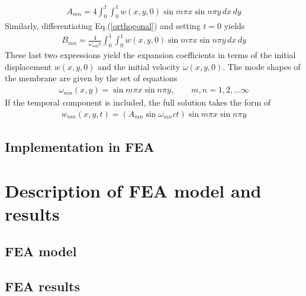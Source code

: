\documentclass[12pt]{article}
\begin{document}
\begin{align}
	A_{mn}=4\int_0^1\int_0^1 w(x,y,0)\sin m\pi x\sin n\pi y \,dx\,dy
\end{align}
Similarly, differentiating Eq.(\ref{orthogonal}) and setting $t=0$ yields
\begin{align}
	B_{mn}=\frac{4}{\omega_{mn}c}\int_0^1\int_0^1 \dot{w}(x,y,0)\sin m\pi x\sin n\pi y \,dx\,dy
\end{align}
These last two expressions yield the expansion coefficients in terms of the initial displacement $w(x,y,0)$ and the initial velocity $\dot{\omega}(x,y,0)$.  The mode shapes of the membrane are given by the set of equations
\begin{align}
	\omega_{mn}(x,y)=\sin m\pi x\sin n\pi y, \qquad m,n=1,2,...\infty
\end{align}
If the temporal component is included, the full solution takes the form of
\begin{align}
	w_{mn}(x,y,t)=\left(A_{mn}\sin\omega_{mn}ct\right)\sin m\pi x\sin n\pi y
\end{align}


\subsection{Implementation in FEA}



\section{Description of FEA model and results}
\subsection{FEA model}

\subsection{FEA results}

\end{document}
